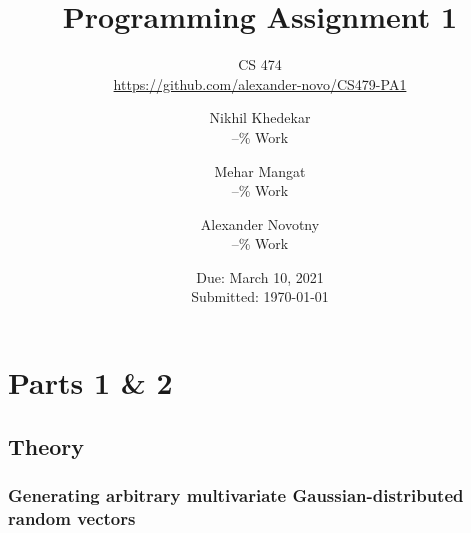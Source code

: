 \documentclass[headings=optiontoheadandtoc,listof=totoc,parskip=full]{scrartcl}
\title{Programming Assignment 1}
\subtitle{CS 474\\\url{https://github.com/alexander-novo/CS479-PA1}}
\author{Nikhil Khedekar\\--\% Work \and Mehar Mangat\\--\% Work \and Alexander Novotny\\--\% Work}
\date{Due: March 10, 2021 \\ Submitted: \today}
\begin{document}
\maketitle
\tableofcontents
{}

\newpage
{}

\section{Parts 1 \& 2}
\label{sec:part-1}

\subsection{Theory}

\subsubsection{Generating arbitrary multivariate Gaussian-distributed random vectors}
\end{document}
